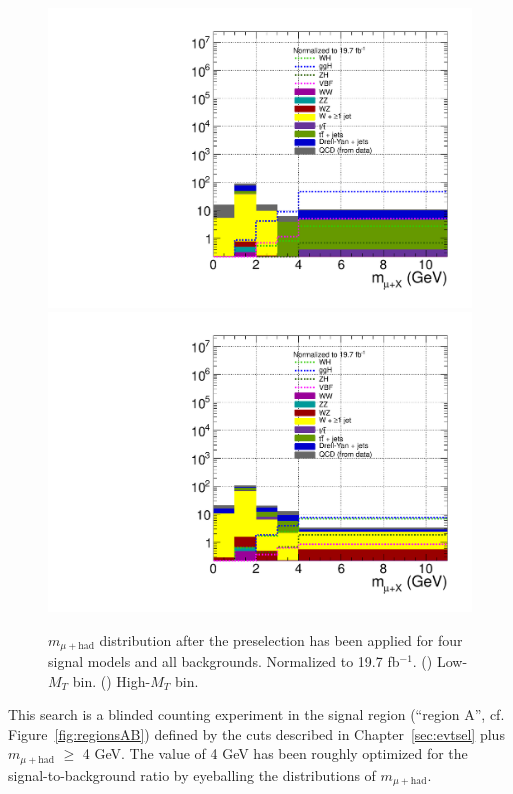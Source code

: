 \begin{figure}[hbtp]
  \begin{center}
    \includegraphics[width=\cmsFigWidth]{figures/sigVsBkg_muHadMass_lowMT_v87}
    \includegraphics[width=\cmsFigWidth]{figures/sigVsBkg_muHadMass_highMT_v87}
    \caption{$m_{\mu+\text{had}}$ distribution after the preselection has been applied for four signal models and all backgrounds. Normalized to 19.7 fb$^{-1}$. (\cmsLeft) Low-$M_{T}$ bin. (\cmsRight) High-$M_{T}$ bin.}
    \label{fig:muhad-mass-MC-region-A}
  \end{center}
\end{figure}

This search is a blinded counting experiment in the signal region (``region A'', cf. Figure~\ref{fig:regionsAB}) defined by the cuts described in Chapter~\ref{sec:evtsel} plus $m_{\mu+\text{had}}$ $\geq$ 4 GeV.  The value of 4 GeV has been roughly optimized for the signal-to-background ratio by eyeballing the distributions of $m_{\mu+\text{had}}$.

